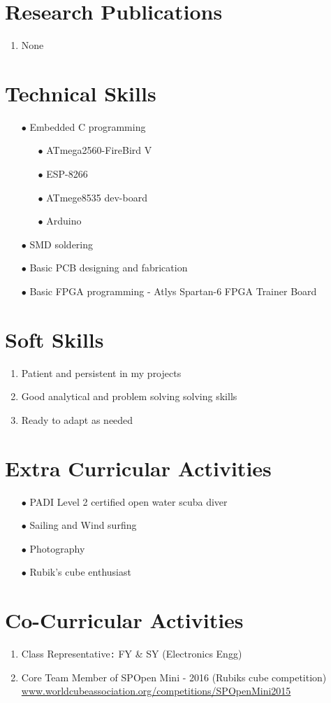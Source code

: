 \documentclass{article}
\begin{document}
	\section*{Research Publications}
	\begin{enumerate}
		\item None
	\end{enumerate}

	\section*{Technical Skills}
		\begin{itemize}
			\item[$\bullet$] Embedded C programming
			\begin{itemize}
				\item[$\bullet$] ATmega2560-FireBird V
				\item[$\bullet$] ESP-8266
				\item[$\bullet$] ATmege8535 dev-board
				\item[$\bullet$] Arduino
			\end{itemize}
			\item[$\bullet$] SMD soldering
			\item[$\bullet$] Basic PCB designing and fabrication
			\item[$\bullet$] Basic FPGA programming - Atlys Spartan-6 FPGA Trainer Board
		\end{itemize}
	
	\section*{Soft Skills}
		\begin{enumerate}
			\item Patient and persistent in my projects
			\item Good analytical and problem solving solving skills
			\item Ready to adapt as needed
		\end{enumerate}	

	\section*{Extra Curricular Activities}
		\begin{itemize}
			\item[$\bullet$] PADI Level 2 certified open water scuba diver
			\item[$\bullet$] Sailing and Wind surfing
			\item[$\bullet$] Photography 
			\item[$\bullet$] Rubik’s cube enthusiast 
		\end{itemize}	
	
	\section*{Co-Curricular Activities}
		\begin{enumerate}
			\item Class Representative\verb|:| FY \& SY (Electronics Engg) 
			\item Core Team Member of SPOpen Mini - 2016 (Rubiks cube competition)\\
			\url{www.worldcubeassociation.org/competitions/SPOpenMini2015}
		\end{enumerate}	
	
\end{document}
